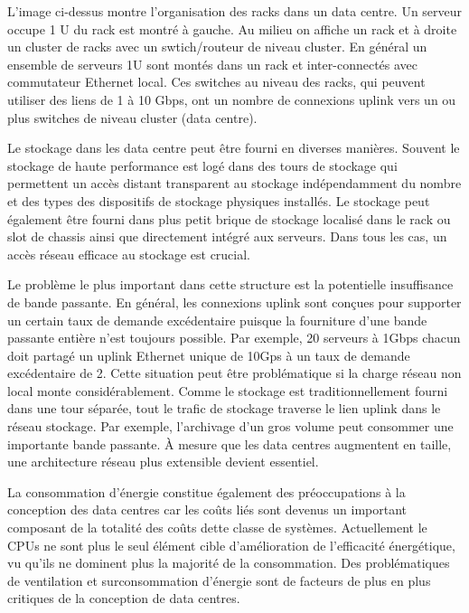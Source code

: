 L'image ci-dessus montre l'organisation des racks dans un data centre. Un serveur occupe 1 U du rack est montré à gauche. Au milieu on affiche un rack et à droite un cluster de racks avec un swtich/routeur de niveau cluster. En général un ensemble de serveurs 1U sont montés dans un rack et inter-connectés avec commutateur Ethernet local. Ces switches au niveau des racks, qui peuvent utiliser des liens de 1 à 10 Gbps, ont un nombre de connexions uplink vers un ou plus switches de niveau cluster (data centre).

Le stockage dans les data centre peut être fourni en diverses manières. Souvent le stockage de haute performance est logé dans des \og  tours de stockage \fg{} qui permettent un accès distant transparent au stockage indépendamment du nombre et des types des dispositifs de stockage physiques installés. Le stockage peut également être fourni dans  plus petit \og  brique de stockage \fg{} localisé dans le rack ou slot de chassis ainsi que directement intégré aux serveurs. Dans tous les cas, un accès réseau efficace au stockage est crucial.

Le problème le plus important dans cette structure est la potentielle insuffisance de bande passante. En général, les connexions uplink sont conçues pour supporter un certain taux de 
demande excédentaire puisque la fourniture d'une bande passante entière n'est toujours possible. Par exemple, 20 serveurs à 1Gbps chacun doit partagé un uplink Ethernet unique de 10Gps à un taux de demande excédentaire de 2. Cette situation peut être problématique si la charge réseau non local monte considérablement. Comme le stockage est traditionnellement fourni dans une tour séparée, tout le trafic de stockage traverse le lien uplink dans le réseau stockage. Par exemple, l'archivage d'un gros volume peut consommer une importante bande passante. À mesure que les data centres augmentent en taille, une architecture réseau plus extensible devient essentiel.

La consommation d'énergie constitue également des préoccupations à la conception des data centres car les coûts liés sont devenus un important composant de la totalité des coûts dette classe de systèmes. Actuellement le CPUs ne sont plus le seul élément cible d'amélioration de l'efficacité énergétique, vu qu'ils ne dominent plus la majorité de la consommation. Des problématiques de ventilation et surconsommation d'énergie sont de facteurs de plus en plus critiques de la conception de data centres.\cite{datacenterAsComputerIntro} \cite{dataCenterEvolution}


